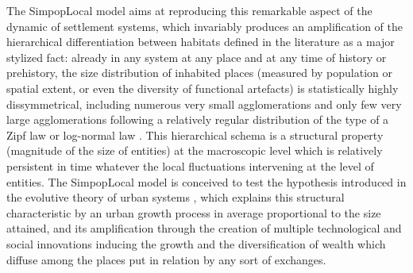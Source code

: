 \documentclass[10pt]{article}
\begin{document}
The SimpopLocal model aims at reproducing this remarkable aspect of the dynamic of settlement systems, which invariably produces an amplification of the hierarchical differentiation between habitats defined in the literature as a major stylized fact: already in any system at any place and at any time of history or prehistory, the size distribution of inhabited places (measured by population or spatial extent, or even the diversity of functional artefacts) is statistically highly dissymmetrical, including numerous very small agglomerations and only few very large agglomerations following a relatively regular distribution of the type of a Zipf law or log-normal law \citep{fletcher1986settlement,liu1996settlement}. This hierarchical schema is a structural property (magnitude of the size of entities) at the macroscopic level which is relatively persistent in time whatever the local fluctuations intervening at the level of entities. The SimpopLocal model is conceived to test the hypothesis introduced in the evolutive theory of urban systems \citep{pumain1997pour}, which explains this structural characteristic by an urban growth process in average proportional to the size attained, and its amplification through the creation of multiple technological and social innovations inducing the growth and the diversification of wealth which diffuse among the places put in relation by any sort of exchanges.
\end{document}
